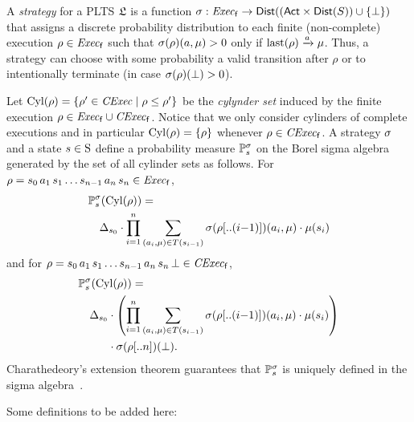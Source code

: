 A \emph{strategy} for a PLTS $\model$ is a function $\strat:
\execf \to \Dist((\Act\times\Dist(S))\cup\{\complete\})$ that assigns
a discrete probability distribution to each finite (non-complete)
execution $\rho\in\execf$ such that $\strat(\rho)(a,\mu) > 0$ only
if $\last(\rho)\reach{a}\mu$.  Thus, a strategy can choose with some
probability a valid transition after $\rho$ or to intentionally
terminate (in case $\strat(\rho)(\complete)>0$).

Let $\Cyl(\rho)=\{\rho'\in\cexec\mid{\rho\leq\rho'}\}$ be the
\emph{cylynder set} induced by the finite execution
$\rho\in\execf\cup\cexecf$.  Notice that we only consider cylinders of
complete executions and in particular $\Cyl(\rho)=\{\rho\}$ whenever
$\rho\in\cexecf$.
%
A strategy $\strat$ and a state $s\in\S$ define a probability
measure $\Prob^\strat_s$ on the Borel sigma algebra generated by the
set of all cylinder sets as follows.
%
For $\rho = s_0\, a_1\, s_1\ldots s_{n-1}\, a_n\, s_n \in \execf$,
%
\begin{align*}
  &\Prob^\strat_s(\Cyl(\rho)) =\\
  &\quad \Dirac_{s_0}\cdot\prod\limits_{i=1}^n\sum\limits_{(a_i,\mu)\in T(s_{i-1})}\strat(\rho[..(i{-}1)])(a_i,\mu)\cdot\mu(s_i)
\end{align*}
%
and for
$\rho = s_0\, a_1\, s_1\ldots s_{n-1}\, a_n\, s_n\, \complete \in \cexecf$,
%
\begin{align*}
  &\Prob^\strat_s(\Cyl(\rho)) =\\
  &\quad \Dirac_{s_0}\cdot\left(\prod\limits_{i=1}^n\sum\limits_{(a_i,\mu)\in T(s_{i-1})}\strat(\rho[..(i{-}1)])(a_i,\mu)\cdot\mu(s_i)\right)\\
  &\phantom{\quad \Dirac_{s_0}} \cdot\strat(\rho[..n])(\complete).
\end{align*}
%
Charathedeory's extension theorem guarantees that $\Prob^\strat_s$ is
uniquely defined in the sigma algebra~\cite{Segala95}.











\bigskip

Some definitions to be added here:

